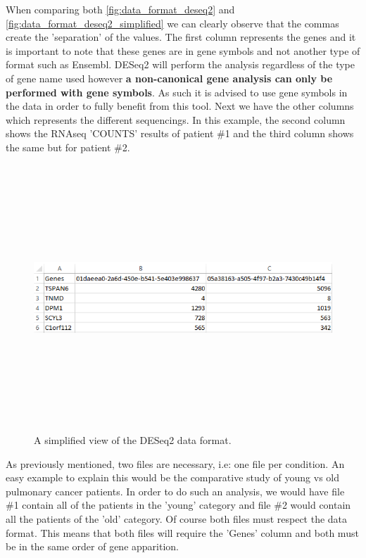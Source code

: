 \documentclass[11pt]{article}
\begin{document}
When comparing both \autoref{fig:data_format_deseq2} and \autoref{fig:data_format_deseq2_simplified} we can clearly observe that the commas create the 'separation' of the values. 
The first column represents the genes and it is important to note that these genes are in gene symbols and not another type of format such as Ensembl. \acrshort{DESeq2} will perform the analysis regardless of the type of gene name used however \textbf{a non-canonical gene analysis can only be performed with gene symbols}. As such it is advised to use gene symbols in the data in order to fully benefit from this tool. Next we have the other columns which represents the different sequencings. In this example, the second column shows the RNAseq 'COUNTS' results of patient \#1 and the third column shows the same but for patient \#2.
\begin{figure}[h!]
\centering
\includegraphics[width=15cm,height=10cm,keepaspectratio]{dese2_excel_data_format.png}
\caption{A simplified view of the \acrshort{DESeq2} data format.}
\label{fig:data_format_deseq2_simplified}
\end{figure}

As previously mentioned, two files are necessary, i.e: one file per condition. An easy example to explain this would be the comparative study of young vs old pulmonary cancer patients. In order to do such an analysis, we would have file \#1 contain all of the patients in the 'young' category and file \#2 would contain all the patients of the 'old' category. Of course both files must respect the data format. This means that both files will require the 'Genes' column and both must be in the same order of gene apparition.
\end{document}
